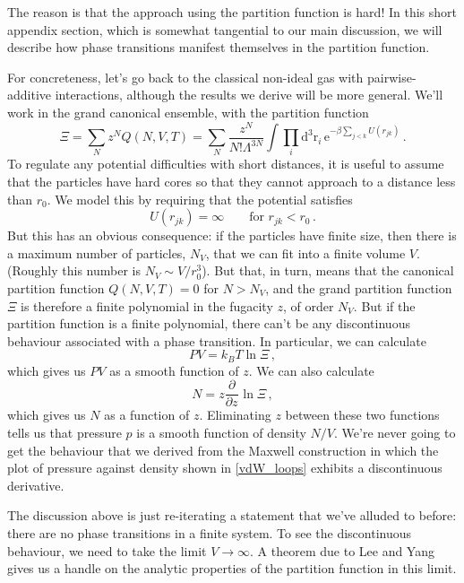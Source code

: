 \documentclass{article}
\theoremstyle{plain}\theoremheaderfont{\normalfont\bfseries}\theorembodyfont{\rmfamily}\theoremseparator{.}\newtheorem*{thm}{Theorem}\newtheorem*{law}{Law}\newtheorem*{pos}{Postulate}
\numberwithin{equation}{section}
\newcommand{\ee}{\mathrm{e}}
\newcommand{\dd}[2][]{\mathrm{d}^{#1} #2\,}
\newcommand{\pdv}[3][]{\frac{\partial^{#1} #2}{{\partial #3}^{#1}}}
\newcommand{\vb}[1]{\bm{\mathrm{#1}}}
\begin{document}
    The reason is that the approach using the partition function is hard! In this short appendix section, which is somewhat tangential to our main discussion, we will describe how phase transitions manifest themselves in the partition function.

    For concreteness, let's go back to the classical non-ideal gas with pairwise-additive interactions, although the results we derive will be more general. We'll work in the grand canonical ensemble, with the partition function
    \begin{equation}
        \Xi=\sum_N z^N Q(N,V,T)=\sum_{N}\frac{z^N}{N!\Lambda^{3N}}\int\prod_{i}\dd[3]{\vb{r}_i}\ee^{-\beta\sum_{j<k}U(r_{jk})}\,.
    \end{equation}
    To regulate any potential difficulties with short distances, it is useful to assume that the particles have hard cores so that they cannot approach to a distance less than \(r_0\). We model this by requiring that the potential satisfies
    \begin{equation}
        U(r_{jk})=\infty\qquad\text{for }r_{jk}<r_0\,.
    \end{equation}
    But this has an obvious consequence: if the particles have finite size, then there is a maximum number of particles, \(N_V\), that we can fit into a finite volume \(V\). (Roughly this number is \(N_V\sim V/r_0^3\)). But that, in turn, means that the canonical partition function \(Q(N,V,T)=0\) for \(N>N_V\), and the grand partition function \(\Xi\) is therefore a finite polynomial in the fugacity \(z\), of order \(N_V\). But if the partition function is a finite polynomial, there can't be any discontinuous behaviour associated with a phase transition. In particular, we can calculate
    \begin{equation}
        PV=k_B T\ln\Xi\,,
    \end{equation}
    which gives us \(PV\) as a smooth function of \(z\). We can also calculate
    \begin{equation}\label{Xi_derivative}
        N=z\pdv{}{z}\ln\Xi\,,
    \end{equation}
    which gives us \(N\) as a function of \(z\). Eliminating \(z\) between these two functions tells us that pressure \(p\) is a smooth function of density \(N/V\). We're never going to get the behaviour that we derived from the Maxwell construction in which the plot of pressure against density shown in \cref{vdW_loops} exhibits a discontinuous derivative.

    The discussion above is just re-iterating a statement that we've alluded to before: there are no phase transitions in a finite system. To see the discontinuous behaviour, we need to take the limit \(V\to\infty\). A theorem due to Lee and Yang gives us a handle on the analytic properties of the partition function in this limit.
\end{document}
